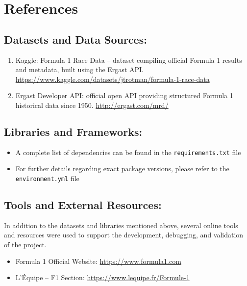 \documentclass[11pt,a4paper]{article}
\begin{document}

\newpage
\section*{References}
\sloppy

\subsection*{Datasets and Data Sources:}

\begin{enumerate}
\item Kaggle: Formula 1 Race Data -- dataset compiling official Formula 1 results and metadata, built using the Ergast API. \url{https://www.kaggle.com/datasets/jtrotman/formula-1-race-data}

\item Ergast Developer API: official open API providing structured Formula 1 historical data since 1950. \url{http://ergast.com/mrd/}
\end{enumerate}

\subsection*{Libraries and Frameworks:}

\begin{itemize}
\item A complete list of dependencies can be found in the \texttt{requirements.txt} file

\item For further details regarding exact package versions, please refer to the \texttt{environment.yml} file
\end{itemize}

\subsection*{Tools and External Resources:}

In addition to the datasets and libraries mentioned above, several online tools and resources were used to support the development, debugging, and validation of the project.

\begin{itemize}
\item Formula 1 Official Website: \url{https://www.formula1.com}

\item L'Équipe -- F1 Section: \url{https://www.lequipe.fr/Formule-1}
\end{itemize}
\end{document}
